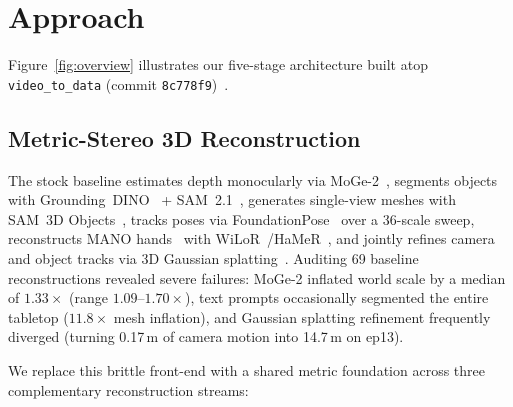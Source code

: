\documentclass[10pt]{nvidiaextabstract}
\begin{document}
\section{Approach}
\label{sec:approach}

Figure~\ref{fig:overview} illustrates our five-stage architecture built atop \texttt{video\_to\_data} (commit \texttt{8c778f9})~\cite{v2d}.

\subsection{Metric-Stereo 3D Reconstruction}
\label{sec:recon}

The stock baseline estimates depth monocularly via MoGe-2~\cite{wang2025moge2}, segments objects with Grounding~DINO~\cite{liu2024groundingdino} + SAM~2.1~\cite{ravi2025sam2}, generates single-view meshes with SAM~3D Objects~\cite{sam3dteam2025sam3d}, tracks poses via FoundationPose~\cite{wen2024foundationpose} over a 36-scale sweep, reconstructs MANO hands~\cite{romero2017mano} with WiLoR~\cite{potamias2025wilor}/HaMeR~\cite{pavlakos2024hamer}, and jointly refines camera and object tracks via 3D Gaussian splatting~\cite{kerbl20233dgs,ye2025gsplat}. Auditing 69 baseline reconstructions revealed severe failures: MoGe-2 inflated world scale by a median of $1.33\times$ (range $1.09$--$1.70\times$), text prompts occasionally segmented the entire tabletop ($11.8\times$ mesh inflation), and Gaussian splatting refinement frequently diverged (turning 0.17\,m of camera motion into 14.7\,m on ep13).

We replace this brittle front-end with a shared metric foundation across three complementary reconstruction streams:
\end{document}
